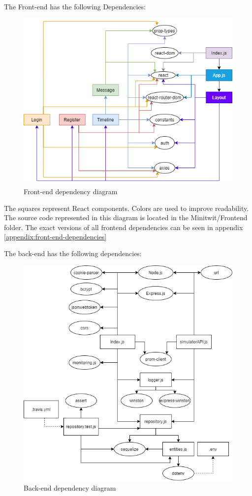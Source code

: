 \noindent The Front-end has the following Dependencies:
\begin{figure}[H]
    \centering
    \includegraphics[width=0.9\linewidth]{report/images/Frontend-dependencies.png}
    \caption{Front-end dependency diagram}
    \label{fig:front-end-depencency-diagram}
\end{figure}
The squares represent React components. Colors are used to improve readability. \\
The source code represented in this diagram is located in the Minitwit/Frontend folder. The exact versions of all frontend dependencies can be seen in appendix \ref{appendix:front-end-dependencies}

\newpage
The back-end has the following dependencies:
\begin{figure}[H]
    \centering
    \includegraphics[width=1\linewidth]{report/images/backend-dependencies.png}
    \caption{Back-end dependency diagram}
    \label{fig:back-end-depencency-diagram}
\end{figure}

